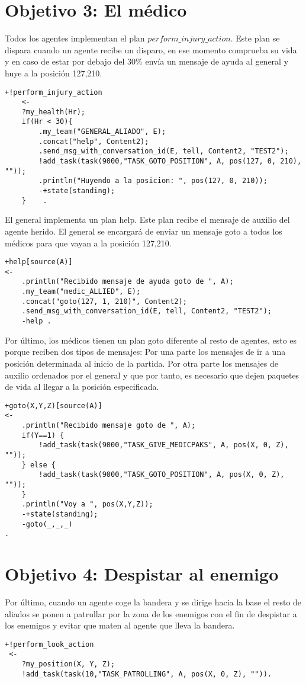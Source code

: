 \documentclass[11pt,oneside,a4paper]{article}
\begin{document}
\section{Objetivo 3: El médico}
Todos los agentes implementan el plan $perform\_injury\_action$. Este plan se dispara cuando un agente recibe un disparo, en ese momento comprueba su vida y en caso de estar por debajo del 30\% envía un mensaje de ayuda al general y huye a la posición 127,210.
\begin{verbatim}
+!perform_injury_action
    <-
    ?my_health(Hr);
    if(Hr < 30){
		.my_team("GENERAL_ALIADO", E);
		.concat("help", Content2);
		.send_msg_with_conversation_id(E, tell, Content2, "TEST2");
		!add_task(task(9000,"TASK_GOTO_POSITION", A, pos(127, 0, 210), ""));
		.println("Huyendo a la posicion: ", pos(127, 0, 210));
		-+state(standing);
    }    .
\end{verbatim}
El general implementa un plan help. Este plan recibe el mensaje de auxilio del agente herido. El general se encargará de enviar un mensaje goto a todos los médicos para que vayan a la posición 127,210.
\begin{verbatim}
+help[source(A)]
<-
	.println("Recibido mensaje de ayuda goto de ", A);
	.my_team("medic_ALLIED", E);
	.concat("goto(127, 1, 210)", Content2);
	.send_msg_with_conversation_id(E, tell, Content2, "TEST2");
	-help .
\end{verbatim} 
Por último, los médicos tienen un plan goto diferente al resto de agentes, esto es porque reciben dos tipos de mensajes: Por una parte los mensajes de ir a una posición determinada al inicio de la partida. Por otra parte los mensajes de auxilio ordenados por el general y que por tanto, es necesario que dejen paquetes de vida al llegar a la posición especificada.
\begin{verbatim}
+goto(X,Y,Z)[source(A)]
<-
	.println("Recibido mensaje goto de ", A);
	if(Y==1) {
		!add_task(task(9000,"TASK_GIVE_MEDICPAKS", A, pos(X, 0, Z), ""));
	} else {
		!add_task(task(9000,"TASK_GOTO_POSITION", A, pos(X, 0, Z), ""));
	}
    .println("Voy a ", pos(X,Y,Z));
	-+state(standing);
	-goto(_,_,_)
.
\end{verbatim}
\section{Objetivo 4: Despistar al enemigo}
Por último, cuando un agente coge la bandera y se dirige hacia la base el resto de aliados se ponen a patrullar por la zona de los enemigos con el fin de despistar a los enemigos y evitar que maten al agente que lleva la bandera.
\begin{verbatim}
+!perform_look_action 
 <-
	?my_position(X, Y, Z);
	!add_task(task(10,"TASK_PATROLLING", A, pos(X, 0, Z), "")).
\end{verbatim}
\end{document}
